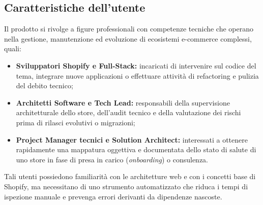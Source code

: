 \subsection{Caratteristiche dell'utente}
Il prodotto si rivolge a figure professionali con competenze tecniche che operano nella gestione, manutenzione ed evoluzione di ecosistemi e-commerce complessi, quali:
\begin{itemize}
    \item \textbf{Sviluppatori Shopify e Full-Stack:} incaricati di intervenire sul codice del tema, integrare nuove applicazioni o effettuare attività di refactoring e pulizia del debito tecnico;
    \item \textbf{Architetti Software e Tech Lead:} responsabili della supervisione architetturale dello store, dell'audit tecnico e della valutazione dei rischi prima di rilasci evolutivi o migrazioni;
    \item \textbf{Project Manager tecnici e Solution Architect:} interessati a ottenere rapidamente una mappatura oggettiva e documentata dello stato di salute di uno store in fase di presa in carico (\textit{onboarding}) o consulenza.
\end{itemize}
Tali utenti possiedono familiarità con le architetture web e con i concetti base di Shopify, ma necessitano di uno strumento automatizzato che riduca i tempi di ispezione manuale e prevenga errori derivanti da dipendenze nascoste.

